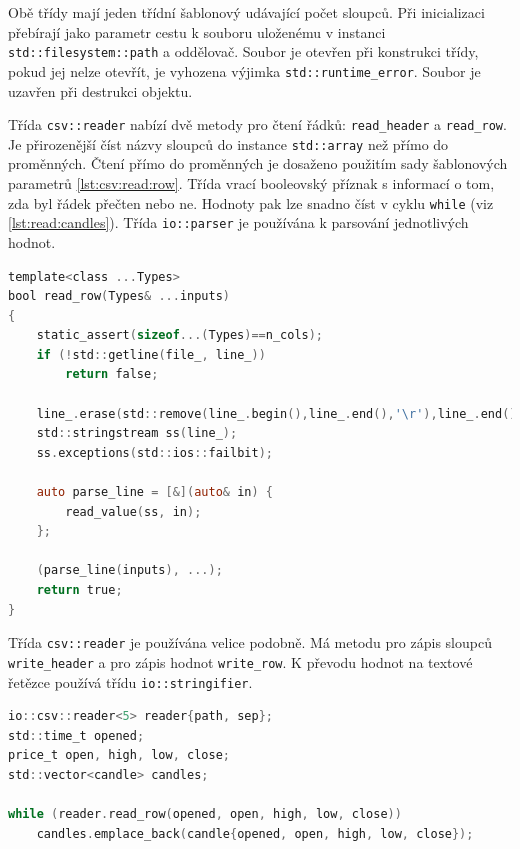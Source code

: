 Obě třídy mají jeden třídní šablonový udávající počet sloupců.
Při inicializaci přebírají jako parametr cestu k souboru uloženému v instanci \texttt{std::filesystem::path} a oddělovač.
Soubor je otevřen při konstrukci třídy, pokud jej nelze otevřít, je vyhozena výjimka \texttt{std::runtime\_error}.
Soubor je uzavřen při destrukci objektu.

Třída \texttt{csv::reader} nabízí dvě metody pro čtení řádků: \texttt{read\_header} a \texttt{read\_row}.
Je přirozenější číst názvy sloupců do instance \texttt{std::array} než přímo do proměnných.
Čtení přímo do proměnných je dosaženo použitím sady šablonových parametrů \ref{lst:csv:read:row}.
Třída vrací booleovský příznak s informací o tom, zda byl řádek přečten nebo ne.
Hodnoty pak lze snadno číst v cyklu \texttt{while} (viz \ref{lst:read:candles}).
Třída \texttt{io::parser} je používána k parsování jednotlivých hodnot.

\begin{lstlisting}[caption={~Implementace čtení řádky třídy \texttt{io::csv::reader}},label={lst:csv:read:row},captionpos=t,abovecaptionskip=-\medskipamount,belowcaptionskip=\medskipamount,language=C]
template<class ...Types>
bool read_row(Types& ...inputs)
{
    static_assert(sizeof...(Types)==n_cols);
    if (!std::getline(file_, line_))
        return false;

    line_.erase(std::remove(line_.begin(),line_.end(),'\r'),line_.end());
    std::stringstream ss(line_);
    ss.exceptions(std::ios::failbit);

    auto parse_line = [&](auto& in) {
        read_value(ss, in);
    };

    (parse_line(inputs), ...);
    return true;
}
\end{lstlisting}

Třída \texttt{csv::reader} je používána velice podobně.
Má metodu pro zápis sloupců \texttt{write\_header} a pro zápis hodnot \texttt{write\_row}.
K převodu hodnot na textové řetězce používá třídu \texttt{io::stringifier}.

\begin{lstlisting}[caption={~Ukázka čtení svíček pomocí \texttt{io::csv::reader}},label={lst:read:candles},captionpos=t,abovecaptionskip=-\medskipamount,belowcaptionskip=\medskipamount,language=C]
io::csv::reader<5> reader{path, sep};
std::time_t opened;
price_t open, high, low, close;
std::vector<candle> candles;

while (reader.read_row(opened, open, high, low, close))
    candles.emplace_back(candle{opened, open, high, low, close});
\end{lstlisting}


